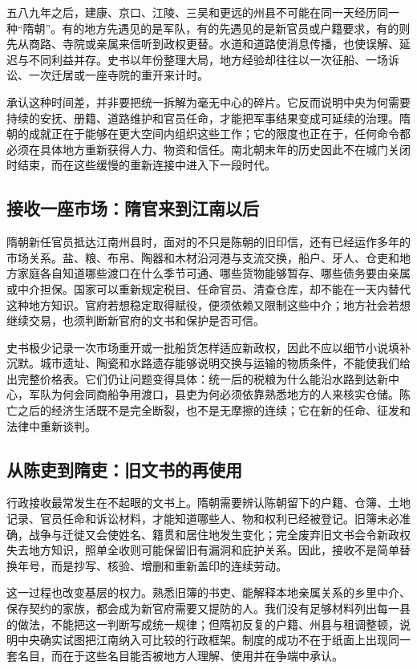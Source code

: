 五八九年之后，建康、京口、江陵、三吴和更远的州县不可能在同一天经历同一种“隋朝”。有的地方先遇见的是军队，有的先遇见的是新官员或户籍要求，有的则先从商路、寺院或亲属来信听到政权更替。水道和道路使消息传播，也使误解、延迟与不同利益并存。史书以年份整理大局，地方经验却往往以一次征船、一场诉讼、一次迁居或一座寺院的重开来计时。

承认这种时间差，并非要把统一拆解为毫无中心的碎片。它反而说明中央为何需要持续的安抚、册籍、道路维护和官员任命，才能把军事结果变成可延续的治理。隋朝的成就正在于能够在更大空间内组织这些工作；它的限度也正在于，任何命令都必须在具体地方重新获得人力、物资和信任。南北朝末年的历史因此不在城门关闭时结束，而在这些缓慢的重新连接中进入下一段时代。

\subsection{接收一座市场：隋官来到江南以后}

隋朝新任官员抵达江南州县时，面对的不只是陈朝的旧印信，还有已经运作多年的市场关系。盐、粮、布帛、陶器和木材沿河港与支流交换，船户、牙人、仓吏和地方家庭各自知道哪些渡口在什么季节可通、哪些货物能够暂存、哪些债务要由亲属或中介担保。国家可以重新规定税目、任命官员、清查仓库，却不能在一天内替代这种地方知识。官府若想稳定取得赋役，便须依赖又限制这些中介；地方社会若想继续交易，也须判断新官府的文书和保护是否可信。

史书极少记录一次市场重开或一批船货怎样适应新政权，因此不应以细节小说填补沉默。城市遗址、陶瓷和水路遗存能够说明交换与运输的物质条件，不能使我们给出完整价格表。它们仍让问题变得具体：统一后的税粮为什么能沿水路到达新中心，军队为何会同商船争用渡口，县吏为何必须依靠熟悉地方的人来核实仓储。陈亡之后的经济生活既不是完全断裂，也不是无摩擦的连续；它在新的任命、征发和法律中重新谈判。

\subsection{从陈吏到隋吏：旧文书的再使用}

行政接收最常发生在不起眼的文书上。隋朝需要辨认陈朝留下的户籍、仓簿、土地记录、官员任命和诉讼材料，才能知道哪些人、物和权利已经被登记。旧簿未必准确，战争与迁徙又会使姓名、籍贯和居住地发生变化；完全废弃旧文书会令新政权失去地方知识，照单全收则可能保留旧有漏洞和庇护关系。因此，接收不是简单替换年号，而是抄写、核验、增删和重新盖印的连续劳动。

这一过程也改变基层的权力。熟悉旧簿的书吏、能解释本地亲属关系的乡里中介、保存契约的家族，都会成为新官府需要又提防的人。我们没有足够材料列出每一县的做法，不能把这一判断写成统一规律；但隋初反复的户籍、州县与租调整顿，说明中央确实试图把江南纳入可比较的行政框架。制度的成功不在于纸面上出现同一套名目，而在于这些名目能否被地方人理解、使用并在争端中承认。

